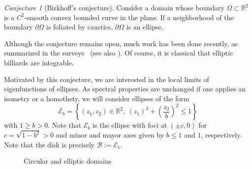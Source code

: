\documentclass{amsart}
\theoremstyle{definition}
\theoremstyle{remark}
\newcommand{\Om}{\Omega}
\def\RR{\mathbb{R}}
\newcommand{\pd}{\partial}
\renewcommand\leq\leqslant
\renewcommand\geq\geqslant
\numberwithin{equation}{section}
\theoremstyle{definition}
\theoremstyle{remark}
\def\RR{\mathbb{R}}
\newtheorem*{conjecture*}{Conjecture}
\begin{document}
\begin{conjecture*}[Birkhoff's conjecture]
	Consider a domain whose boundary $\Omega\subset\RR^2$  is a $C^2$-smooth convex bounded curve in the plane. If a neighborhood of the boundary $\partial \Om$  is foliated by caustics, $\pd\Omega$ is an ellipse.
\end{conjecture*}

Although the conjecture remains open, much work has been done recently, as summarized in the surveys~\cite{Bialy,Kaloshin} (see also \cite{Avila,Bialy93,Ros,Innami,Huang,KaloshinAnnals,Kaloshin24,Mather}). Of course, it is classical that elliptic billiards are integrable.

Motivated by this conjecture, we are interested in the local limits of eigenfunctions of ellipses. As spectral properties are unchanged if one applies
an isometry or a homothety, we will consider ellipses of the form \begin{equation}
	\mathcal{E}_{b}=\left\{(z_1,z_2)\in\mathbb{R}^{2},\ \left(z_1\right)^2+\left(\frac{z_2}{b}\right)^2\leq 1\right\}
\end{equation} 
with $1\geq b>0$. Note that $\mathcal{E}_{b}$ is the ellipse with foci at $(\pm c,0)$ for $c=\sqrt{1-b^2}>0$ and minor and mayor axes given by $b\leq1$ and $1$, respectively. Note that the disk is precisely $\mathcal B:=\mathcal{E}_{1}$. 

\begin{figure}\renewcommand\thefigure{1.3}
	\caption{Circular and elliptic domains}
\end{figure}
	
\end{document}
